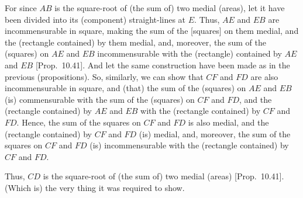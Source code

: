 \begin{Parallel}{}{}
{For since $AB$ is the square-root of (the sum of) two medial (areas),
let it have been divided into its (component) straight-lines at $E$.
Thus, $AE$ and $EB$ are incommensurable in square, making the sum of
the [squares] on them medial, and the (rectangle contained) by them
medial, and, moreover, the sum of the (squares) on $AE$ and $EB$
incommensurable with the (rectangle) contained by $AE$ and $EB$ [Prop.~10.41]. And let the same construction
have been made as in the previous (propositions). So, similarly, we
can show that $CF$ and $FD$ are also incommensurable in square,
and (that) the sum of the (squares) on $AE$ and $EB$ (is)
commensurable with the sum of the (squares) on $CF$ and $FD$, and the
(rectangle contained) by $AE$ and $EB$ with the (rectangle contained)
by $CF$ and $FD$. Hence, the sum of the squares on $CF$ and
$FD$ is also medial, and the (rectangle contained) by $CF$ and $FD$
(is) medial, and, moreover, the sum of the squares on $CF$ and $FD$
(is) incommensurable with the (rectangle contained) by $CF$ and $FD$.

Thus, $CD$ is the square-root of (the sum of) two medial (areas) [Prop.~10.41].
(Which is) the very thing it was required to show.}
\end{Parallel}

